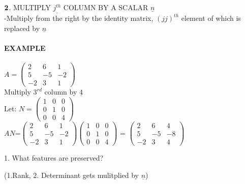 \documentclass[]{article}
\let\oldparagraph\paragraph
\renewcommand{\paragraph}[1]{\oldparagraph{#1}\mbox{}}
\begin{document}
\(\bold{2}\). MULTIPLY \(\underline{j^{th}}\) COLUMN BY A SCALAR
\(\underline{n}\)\\

-Multiply from the right by the identity matrix, \((jj)^{th}\) element
of which is replaced by \(\underline{n}\)\\

\paragraph{\texorpdfstring{EXAMPLE\\
}{EXAMPLE }}\label{example-9}

\(A =\begin{pmatrix} 2 & 6 & 1\\ 5 & -5 & -2 \\ -2 & 3 & 1 \end{pmatrix}\)\\

Multiply \(3^{rd}\) column by \(\underline{4}\)\\

Let:
\(N =\begin{pmatrix} 1 & 0 & 0\\ 0 & 1 & 0 \\ 0 & 0 & 4 \end{pmatrix}\)\\

\(AN\)=\(\begin{pmatrix} 2 & 6 & 1\\ 5 & -5 & -2 \\ -2 & 3 & 1 \end{pmatrix}\begin{pmatrix} 1 & 0 & 0\\ 0 & 1 & 0 \\ 0 & 0 & 4 \end{pmatrix}\)
=
\(\begin{pmatrix} 2 & 6 & 4\\ 5 & -5 & -8 \\ -2 & 3 & 4 \end{pmatrix}\)\\

\begin{tcolorbox}[colback=yellow!5,colframe=yellow!40!black,title=Question]
1. What features are preserved?

(1.Rank, 2. Determinant gets mulitplied by $\underline{n}$)

\end{tcolorbox}
\end{document}
